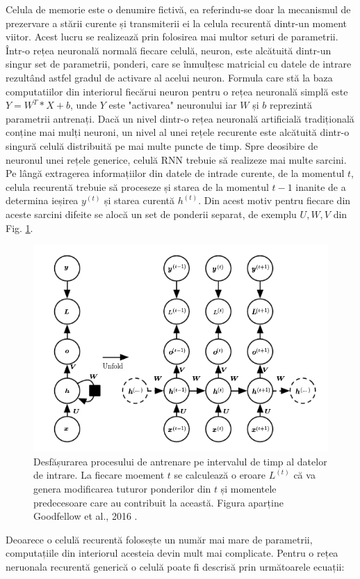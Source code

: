 \documentclass[a4paper,12pt]{book}
\begin{document}
				Celula de memorie este o denumire fictivă, ea referindu-se doar la mecanismul de prezervare a stării curente și transmiterii ei la celula recurentă dintr-un moment viitor. Acest lucru se realizează prin folosirea mai multor seturi de parametrii. Într-o rețea neuronală normală fiecare celulă, neuron, este alcătuită dintr-un singur set de parametrii, ponderi, care se înmulțesc matricial cu datele de intrare rezultând astfel gradul de activare al acelui neuron. Formula care stă la baza computatiilor din interiorul fiecărui neuron pentru o rețea neuronală simplă  este $Y = W^T * X + b$, unde $Y$ este "activarea" neuronului iar $W$ și $b$  reprezintă parametrii antrenați. Dacă un nivel dintr-o rețea neuronală artificială tradițională conține mai mulți neuroni, un nivel al unei rețele recurente este alcătuită dintr-o singură celulă distribuită pe mai multe puncte de timp. Spre deosibire de neuronul unei rețele generice, celulă RNN trebuie să realizeze mai multe sarcini. Pe lângă extragerea informațiilor din datele de intrade curente, de la momentul $t$, celula recurentă trebuie să proceseze și starea de la momentul $t-1$ inanite de a determina ieșirea $y^{(t)}$ și starea curentă $h^{(t)}$. Din acest motiv pentru fiecare din aceste sarcini difeite se alocă un set de ponderii separat, de exemplu $U, W, V$ din Fig. \ref{fig:rnn_layer}.
				
				\begin{figure}[h]
					\centering
					\includegraphics[scale=0.6]{rnn_layer}
					\caption{Desfășurarea procesului de antrenare pe intervalul de timp al datelor de intrare. La fiecare moement $t$ se calculează o eroare $L^{(t)}$ că va genera modificarea tuturor ponderilor din $t$ și momentele predecesoare care au contribuit la această. Figura aparține Goodfellow et al., 2016 \cite{dpb}.}
					\label{fig:rnn_layer}
				\end{figure} 
					Deoarece o celulă recurentă folosește un număr mai mare de parametrii, computațiile din interiorul acesteia devin mult mai complicate. Pentru o rețea neruonala recurentă generică o celulă poate fi descrisă prin următoarele ecuații:
				
\end{document}
